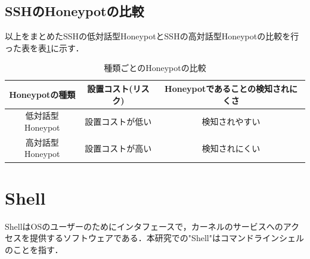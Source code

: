 \subsection{SSHのHoneypotの比較}
\label{tech:CompareHoneypot}
以上をまとめたSSHの低対話型HoneypotとSSHの高対話型Honeypotの比較を行った表を表\ref{table:compare}に示す．

\vspace{3mm}
\newlength{\myheight}
\setlength{\myheight}{10mm}
\begin{table}[h]
 \caption{種類ごとのHoneypotの比較}
 \label{table:compare}
 \centering
  \begin{tabular}{|c||c|c|}
   \hline
   Honeypotの種類 & 設置コスト(リスク) & Honeypotであることの検知されにくさ \\
    \hline \hline
     \parbox[c][\myheight][c]{0cm}{} 低対話型Honeypot  & 設置コストが低い & 検知されやすい \\
     \hline
     \parbox[c][\myheight][c]{0cm}{} 高対話型Honeypot  & 設置コストが高い & 検知されにくい \\
     \hline
  \end{tabular}
\end{table}
\vspace{7mm}



\section{Shell}
\label{tech:Shell}
ShellはOSのユーザーのためにインタフェースで，カーネルのサービスへのアクセスを提供するソフトウェアである．本研究での"Shell"はコマンドラインシェルのことを指す．

